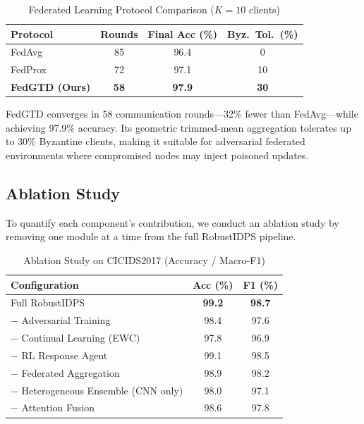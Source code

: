 \documentclass[journal,twoside]{IEEEtran}
\begin{document}
\begin{table}[!t]
\centering
\caption{Federated Learning Protocol Comparison ($K{=}10$ clients)}
\label{tab:federated}
\renewcommand{\arraystretch}{1.15}
\begin{tabular}{@{}lccc@{}}
\toprule
\textbf{Protocol} & \textbf{Rounds} & \textbf{Final Acc (\%)} & \textbf{Byz.\ Tol.\ (\%)} \\
\midrule
FedAvg~\cite{McMahan2017}   & 85  & 96.4 & 0 \\
FedProx~\cite{Li2020FedProx} & 72  & 97.1 & 10 \\
\textbf{FedGTD (Ours)}       & \textbf{58} & \textbf{97.9} & \textbf{30} \\
\bottomrule
\end{tabular}
\end{table}

FedGTD converges in 58 communication rounds---32\% fewer than FedAvg---while achieving 97.9\% accuracy. Its geometric trimmed-mean aggregation tolerates up to 30\% Byzantine clients, making it suitable for adversarial federated environments where compromised nodes may inject poisoned updates.

\subsection{Ablation Study}

To quantify each component's contribution, we conduct an ablation study by removing one module at a time from the full RobustIDPS pipeline.

\begin{table}[!t]
\centering
\caption{Ablation Study on CICIDS2017 (Accuracy / Macro-F1)}
\label{tab:ablation}
\renewcommand{\arraystretch}{1.15}
\begin{tabular}{@{}lcc@{}}
\toprule
\textbf{Configuration} & \textbf{Acc (\%)} & \textbf{F1 (\%)} \\
\midrule
Full RobustIDPS                    & \textbf{99.2} & \textbf{98.7} \\
\midrule
$-$ Adversarial Training           & 98.4 & 97.6 \\
$-$ Continual Learning (EWC)       & 97.8 & 96.9 \\
$-$ RL Response Agent              & 99.1 & 98.5 \\
$-$ Federated Aggregation          & 98.9 & 98.2 \\
$-$ Heterogeneous Ensemble (CNN only) & 98.0 & 97.1 \\
$-$ Attention Fusion               & 98.6 & 97.8 \\
\bottomrule
\end{tabular}
\end{table}
\end{document}
